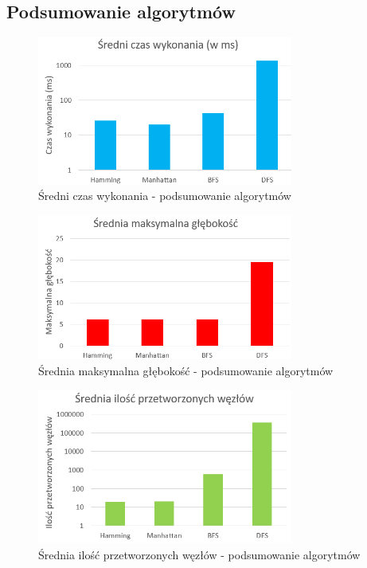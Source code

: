 \documentclass{classrep}
\begin{document}
\newpage
\subsection{Podsumowanie algorytmów}
\begin{figure}[h!]
    \centering
    \includegraphics[width=0.75\textwidth]{czasALL.png}
    \caption{Średni czas wykonania - podsumowanie algorytmów}
	\label{czasALL}
\end{figure}
\begin{figure}[h!]
    \centering
    \includegraphics[width=0.75\textwidth]{depthALL.png}
    \caption{Średnia maksymalna głębokość - podsumowanie algorytmów}
	\label{depthALL}
\end{figure}
\begin{figure}[h!]
    \centering
    \includegraphics[width=0.75\textwidth]{processedALL.png}
    \caption{Średnia ilość przetworzonych węzłów - podsumowanie algorytmów}
	\label{processedALL}
\end{figure}
\end{document}
